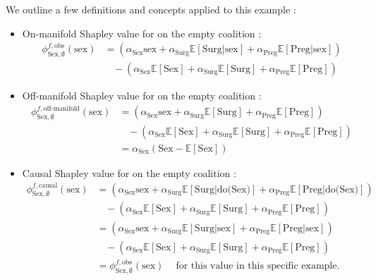 \documentclass{article}
\theoremstyle{plain}
\theoremstyle{definition}
\theoremstyle{remark}
\theoremstyle{mystyle}
\begin{document}
We outline a few definitions and concepts applied to this example :
\begin{itemize}
    \item On-manifold Shapley value for  on the empty coalition :
    \begin{align*}
        \phi^{f,\text{obs}}_{\text{Sex},\emptyset}(\text{sex}) &= (\alpha_\text{Sex} \text{sex} + \alpha_\text{Surg} \mathbb{E}[\text{Surg}|\text{sex}] + \alpha_\text{Preg} \mathbb{E}[\text{Preg}|\text{sex}])\\
        & \ \ \ \ - (\alpha_\text{Sex} \mathbb{E}[\text{Sex}] + \alpha_\text{Surg} \mathbb{E}[\text{Surg}] + \alpha_\text{Preg} \mathbb{E}[\text{Preg}]) 
    \end{align*}
    \item Off-manifold Shapley value for  on the empty coalition :
    \begin{align*}
        \phi^{f,\text{off-manifold}}_{\text{Sex},\emptyset}(\text{sex}) &= (\alpha_\text{Sex} \text{sex} + \alpha_\text{Surg} \mathbb{E}[\text{Surg}] + \alpha_\text{Preg} \mathbb{E}[\text{Preg}])\\
        & \ \ \ \ - (\alpha_\text{Sex} \mathbb{E}[\text{Sex}] + \alpha_\text{Surg} \mathbb{E}[\text{Surg}] + \alpha_\text{Preg} \mathbb{E}[\text{Preg}]) \\
        &= \alpha_\text{Sex} (\text{Sex} - \mathbb{E}[\text{Sex}])
    \end{align*}
    \item Causal Shapley value for  on the empty coalition :
    \begin{align*}
        \phi^{f,\text{causal}}_{\text{Sex},\emptyset}(\text{sex})
        &= (\alpha_\text{Sex} \text{sex} + \alpha_\text{Surg} \mathbb{E}[\text{Surg}|\text{do(Sex)}] + \alpha_\text{Preg} \mathbb{E}[\text{Preg}|\text{do(Sex)}])\\
        & \ \ \ \ - (\alpha_\text{Sex} \mathbb{E}[\text{Sex}] + \alpha_\text{Surg} \mathbb{E}[\text{Surg}] + \alpha_\text{Preg} \mathbb{E}[\text{Preg}]) \\
        &= (\alpha_\text{Sex} \text{sex} + \alpha_\text{Surg} \mathbb{E}[\text{Surg}|\text{sex}] + \alpha_\text{Preg} \mathbb{E}[\text{Preg}|\text{sex}])\\
        & \ \ \ \ - (\alpha_\text{Sex} \mathbb{E}[\text{Sex}] + \alpha_\text{Surg} \mathbb{E}[\text{Surg}] + \alpha_\text{Preg} \mathbb{E}[\text{Preg}]) \\
        &= \phi^{f,\text{obs}}_{\text{Sex},\emptyset}(\text{sex}) \ \ \ \ \text{ for this value in this specific example}.

\end{align*}
\end{itemize}
\end{document}
